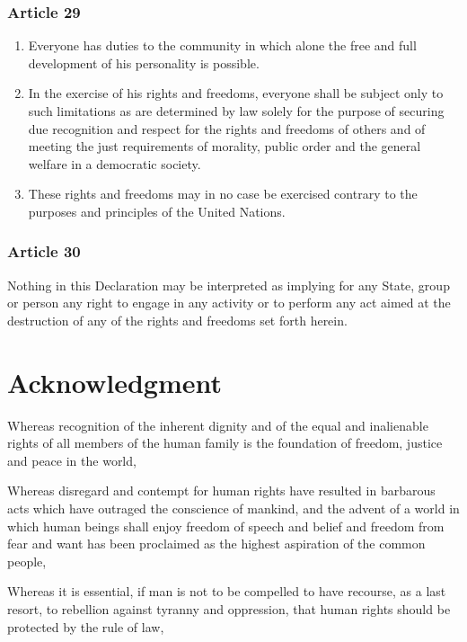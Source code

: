 \documentclass[
  titlepage,
  openright,
  DIV=calc,
  toc=listof,
  listof=nochaptergap]{scrbook}
\begin{document}
\hypertarget{article-29-4}{%
\subsection{Article 29}\label{article-29-4}}

\begin{enumerate}
\def\labelenumi{\arabic{enumi}.}
\item
  Everyone has duties to the community in which alone the free and full
  development of his personality is possible.
\item
  In the exercise of his rights and freedoms, everyone shall be subject
  only to such limitations as are determined by law solely for the
  purpose of securing due recognition and respect for the rights and
  freedoms of others and of meeting the just requirements of morality,
  public order and the general welfare in a democratic society.
\item
  These rights and freedoms may in no case be exercised contrary to the
  purposes and principles of the United Nations.
\end{enumerate}

\hypertarget{article-30-4}{%
\subsection{Article 30}\label{article-30-4}}

Nothing in this Declaration may be interpreted as implying for any
State, group or person any right to engage in any activity or to perform
any act aimed at the destruction of any of the rights and freedoms set
forth herein.

\hypertarget{sec:acknowledgment}{%
\chapter{Acknowledgment}\label{sec:acknowledgment}}

Whereas recognition of the inherent dignity and of the equal and
inalienable rights of all members of the human family is the foundation
of freedom, justice and peace in the world,

Whereas disregard and contempt for human rights have resulted in
barbarous acts which have outraged the conscience of mankind, and the
advent of a world in which human beings shall enjoy freedom of speech
and belief and freedom from fear and want has been proclaimed as the
highest aspiration of the common people,

Whereas it is essential, if man is not to be compelled to have recourse,
as a last resort, to rebellion against tyranny and oppression, that
human rights should be protected by the rule of law,
\end{document}
